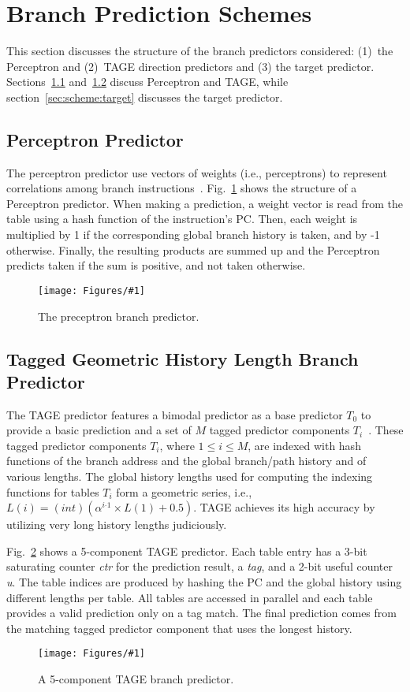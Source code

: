 \documentclass[conference]{IEEEtran}
\newcommand{\kfig}[4]{ %
        \begin{figure}[!t]
        \centering
        \texttt{[image: Figures/\#1]}
        \vspace{-1mm}
        \caption{#3}
        \label{#2}
        \end{figure}
}
\begin{document}
\section{Branch Prediction Schemes}
\label{sec:scheme}
This section discusses the structure of the branch predictors considered: (1)\ the Perceptron and (2)\ TAGE direction predictors and (3) the target predictor. Sections~\ref{sec:scheme:perceptron} and~\ref{sec:scheme:tage} discuss Perceptron and TAGE, while section~\ref{sec:scheme:target} discusses the target predictor.

\subsection{Perceptron Predictor}
\label{sec:scheme:perceptron}
The perceptron predictor use vectors of weights (i.e., perceptrons) to represent correlations among branch instructions~\cite{perceptron}. Fig.~\ref{fig:perceptron} shows the structure of a Perceptron predictor. When making a prediction, a weight vector is read from the table using a hash function of the instruction's PC. Then, each weight is multiplied by 1 if the corresponding global branch history is taken, and by -1 otherwise. Finally, the resulting products are summed up and the Perceptron predicts taken if the sum is positive, and not taken otherwise.
\kfig{perceptron.pdf}{fig:perceptron}{The preceptron branch predictor.}{angle = 0, trim = 1in 3.5in 2in 1.1in, clip, width=0.3\textwidth}

\subsection{Tagged Geometric History Length Branch Predictor}
\label{sec:scheme:tage}
The TAGE predictor features a bimodal predictor as a base predictor $T_0$ to provide a basic prediction and a set of $M$ tagged predictor components $T_i$~\cite{tage}. These tagged predictor components $T_i$, where $1\leq i\leq M$, are indexed with hash functions of the branch address and the global branch/path history and of various lengths. The global history lengths used for computing the indexing functions for tables $T_i$ form a geometric series, i.e., $L(i) = (int)(\alpha^{i{}^{\_}1}\times L(1)+0.5)$. TAGE achieves its high accuracy by utilizing very long history lengths judiciously.

Fig.~\ref{fig:tage} shows a 5-component TAGE predictor. Each table entry has a 3-bit saturating counter \textit{ctr} for the prediction result, a \textit{tag}, and a 2-bit useful counter \textit{u}. The table indices are produced by hashing the PC and the global history using different lengths per table. All tables are accessed in parallel and each table provides a valid prediction only on a tag match. The final prediction comes from the matching tagged predictor component that uses the longest history.
\kfig{tage.pdf}{fig:tage}{A 5-component TAGE branch predictor.}{angle = 0, trim = 0.6in 0.6in 0.4in 0.2in, clip, width=0.35\textwidth}
\end{document}
